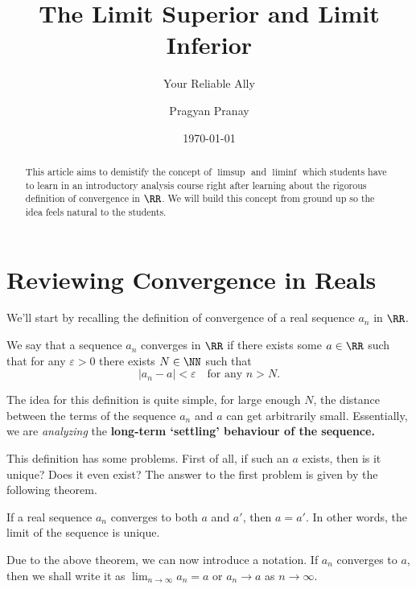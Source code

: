 \documentclass[parskip=half, numbers=endperiod, 11pt]{scrartcl}
\begin{document}
\title{The Limit Superior and Limit Inferior}
\subtitle{Your Reliable Ally}
\author{Pragyan Pranay}
\date{\today}
\maketitle

\begin{abstract}
	This article aims to demistify the concept of
	$\limsup$ and $\liminf$ which students have to learn
	in an introductory analysis course right after
	learning about the rigorous definition of convergence
	in $\RR$. We will build this concept from ground up
	so the idea feels natural to the students.
\end{abstract}

\tableofcontents
\newpage

\section{Reviewing Convergence in Reals} %
We'll start by recalling the definition of convergence
of a real sequence $a_n$ in $\RR$.

\begin{definition}[Convergence in $\RR$]
	We say that a sequence $a_n$ converges in $\RR$ if
	there exists some $a \in \RR$ such that for
	any $\varepsilon > 0$ there exists $N \in \NN$ such
	that
	\[|a_n - a| < \varepsilon \quad \text{for any $n > N.$} \]
\end{definition}

The idea for this definition is quite simple, for large
enough $N$, the distance between the terms of the sequence
$a_n$ and $a$ can get arbitrarily small. Essentially,
we are \emph{analyzing} the \textbf{long-term `settling'
	behaviour of the sequence.}

This definition has some problems. First of all, if such
an $a$ exists, then is it unique? Does it even exist? The
answer to the first problem is given by the following
theorem.

\begin{theorem}[Uniqueness]
	If a real sequence $a_n$ converges to both $a$ and
	$a'$, then $a = a'$. In other words, the limit of the
	sequence is unique.
\end{theorem}

Due to the above theorem, we can now introduce a notation.
If $a_n$ converges to $a$, then we shall write it as
$\displaystyle \lim_{n \to \infty} a_n = a$ or $a_n \to a$
as $n \to \infty$.
\end{document}
